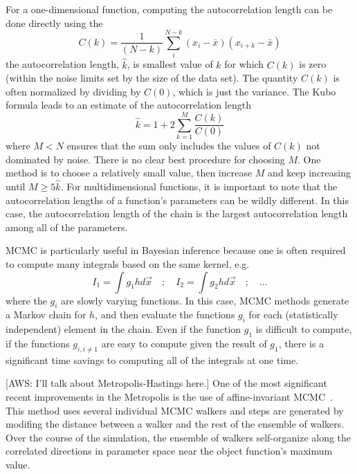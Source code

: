 For a one-dimensional function, computing the autocorrelation length
can be done directly using the 
\begin{equation}
  C(k) = \frac{1}{(N-k)}
  \sum_i^{N-k} (x_i- \bar{x})(x_{i+k}- \bar{x})
\end{equation}
the autocorrelation length, $\hat{k}$, is smallest value of $k$ for which
$C(k)$ is zero (within the noise limits set by the size of the data
set). The quantity $C(k)$ is often normalized by dividing by
$C(0)$, which is just the variance.
The Kubo formula leads to an estimate of the autocorrelation
length
\begin{equation}
  \hat{k} = 1 + 2 \sum_{k=1}^{M} \frac{C(k)}{C(0)}
\end{equation}
where $M < N$ ensures that the sum only includes the values of $C(k)$
not dominated by noise. There is no clear best procedure for choosing
$M$. One method is to choose a relatively small value, then increase
$M$ and keep increasing until $M\geq 5 \hat{k}$. For multidimensional
functions, it is important to note that the autocorrelation lengths of
a function's parameters can be wildly different. In this case, the
autocorrelation length of the chain is the largest autocorrelation
length among all of the parameters.

MCMC is particularly useful in Bayesian inference because one is
often required to compute many integrals based on the same kernel,
e.g.
\begin{equation}
  I_1 = \int g_1 h d \vec{x} \quad ; \quad
  I_2 = \int g_2 h d \vec{x} \quad ; \quad \ldots
\end{equation}
where the $g_i$ are slowly varying functions. In this case, MCMC
methods generate a Markov chain for $h$, and then evaluate the
functions $g_i$ for each (statistically independent) element in the
chain. Even if the function $g_1$ is difficult to compute, 
if the functions $g_{i,i\neq 1}$ are easy to compute given the
result of $g_1$, there is a significant time savings to computing
all of the integrals at one time.

[AWS: I'll talk about Metropolis-Hastings here.]
One of the most significant recent improvements in the
Metropolis is the use of affine-invariant MCMC~\cite{Goodman10}.
This method uses several individual MCMC walkers and steps
are generated by modifing the distance between a walker and
the rest of the ensemble of walkers. Over the course of the
simulation, the ensemble of walkers self-organize along
the correlated directions in parameter space near the
object function's maximum value.

